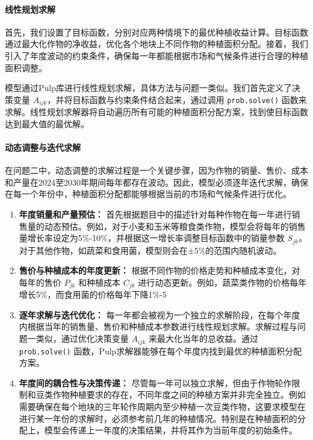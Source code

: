 \documentclass[12pt,a4paper]{nmmcm}
\begin{document}
\paragraph{线性规划求解}

首先，我们设置了目标函数，分别对应两种情境下的最优种植收益计算。目标函数通过最大化作物的净收益，优化各个地块上不同作物的种植面积分配。接着，我们引入了年度波动的约束条件，确保每一年都能根据市场和气候条件进行合理的种植面积调整。

模型通过Pulp库进行线性规划求解，具体方法与问题一类似。我们首先定义了决策变量 $A_{ijk}$，并将目标函数与约束条件结合起来，通过调用 \texttt{prob.solve()} 函数来求解。线性规划求解器将自动遍历所有可能的种植面积分配方案，找到使目标函数达到最大值的最优解。

\paragraph{动态调整与迭代求解}

在问题二中，动态调整的求解过程是一个关键步骤，因为作物的销量、售价、成本和产量在2024至2030年期间每年都存在波动。因此，模型必须逐年迭代求解，确保在每一个年份中，种植面积分配都能够根据当前的市场和气候条件进行优化。

\begin{enumerate}
    \item \textbf{年度销量和产量预估：} 首先根据题目中的描述针对每种作物在每一年进行销售量的动态预估。例如，对于小麦和玉米等粮食类作物，模型会将每年的销售量增长率设定为5\%-10\%，并根据这一增长率调整目标函数中的销量参数 $S_{jk}$。对于其他作物，如蔬菜和食用菌，模型则会在±5\%的范围内随机波动。
    
    \item \textbf{售价与种植成本的年度更新：} 根据不同作物的价格走势和种植成本变化，对每年的售价 $P_{jk}$ 和种植成本 $C_{jk}$ 进行动态更新。例如，蔬菜类作物的价格每年增长5\%，而食用菌的价格每年下降1\%-5%
    
    \item \textbf{逐年求解与迭代优化：} 每一年都会被视为一个独立的求解阶段，在每个年度内根据当年的销售量、售价和种植成本参数进行线性规划求解。求解过程与问题一类似，通过优化决策变量 $A_{ijk}$ 来最大化当年的总收益。通过 \texttt{prob.solve()} 函数，Pulp求解器能够在每个年度内找到最优的种植面积分配方案。
    
    \item \textbf{年度间的耦合性与决策传递：} 尽管每一年可以独立求解，但由于作物轮作限制和豆类作物种植要求的存在，不同年度之间的种植方案并非完全独立。例如需要确保在每个地块的三年轮作周期内至少种植一次豆类作物，这要求模型在进行某一年份的求解时，必须参考前几年的种植情况。特别是在种植面积的分配上，模型会传递上一年度的决策结果，并将其作为当前年度的初始条件。
\end{enumerate}
\end{document}
